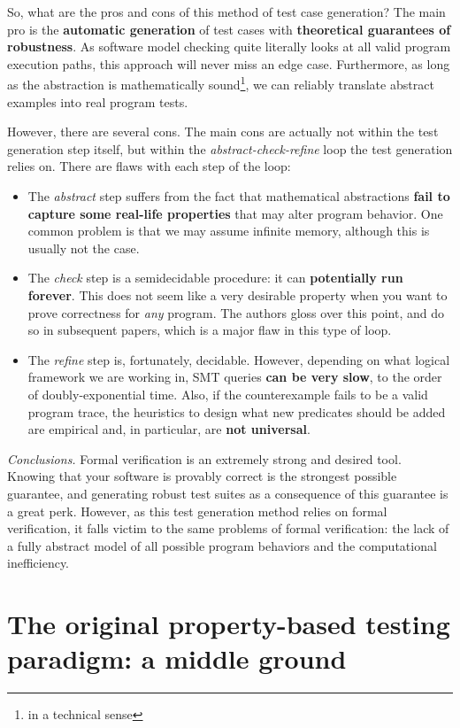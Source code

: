 \documentclass[acmsmall,review, nonacm]{acmart}
\begin{document}
So, what are the pros and cons of this method of test case generation? The main pro is the \textbf{automatic generation} of test cases with \textbf{theoretical guarantees of robustness}. As software model checking quite literally looks at all valid program execution paths, this approach will never miss an edge case. Furthermore, as long as the abstraction is mathematically sound\footnote{in a technical sense}, we can reliably translate abstract examples into real program tests. 

However, there are several cons. The main cons are actually not within the test generation step itself, but within the \textit{abstract-check-refine} loop the test generation relies on. There are flaws with each step of the loop:

\begin{itemize}
  \item The \textit{abstract} step suffers from the fact that mathematical abstractions \textbf{fail to capture some real-life properties} that may alter program behavior. One common problem is that we may assume infinite memory, although this is usually not the case.  
  \item The \textit{check} step is a semidecidable procedure: it can \textbf{potentially run forever}. This does not seem like a very desirable property when you want to prove correctness for \textit{any} program. The authors gloss over this point, and do so in subsequent papers, which is a major flaw in this type of loop.
  \item The \textit{refine} step is, fortunately, decidable. However, depending on what logical framework we are working in, SMT queries \textbf{can be very slow}, to the order of doubly-exponential time. Also, if the counterexample fails to be a valid program trace, the heuristics to design what new predicates should be added are empirical and, in particular, are \textbf{not universal}.  
\end{itemize}

\textit{Conclusions.} Formal verification is an extremely strong and desired tool. Knowing that your software is provably correct is the strongest possible guarantee, and generating robust test suites as a consequence of this guarantee is a great perk. However, as this test generation method relies on formal verification, it falls victim to the same problems of formal verification: the lack of a fully abstract model of all possible program behaviors and the computational inefficiency. 

\section{The original property-based testing paradigm: a middle ground}
\end{document}
